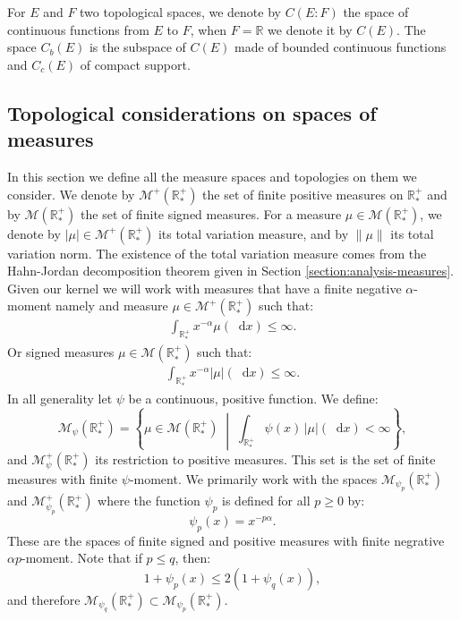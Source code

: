 \documentclass[11pt,a4paper]{article}
\newcommand{\RR}{\mathbb{R}}
\newcommand{\RRP}{\mathbb{R}^+_*}
\newcommand{\MC}{\mathcal{M}}
\newcommand{\dd}{\mathop{}\!\mathrm{d}}
\begin{document}
For $E$ and $F$ two topological spaces, we denote by $C(E:F)$ the space of continuous functions from $E$ to $F$, when $F = \RR$ we denote it by $C(E)$. The space $C_b(E)$ is the subspace of $C(E)$ made of bounded continuous functions and $C_c(E)$ of compact support. 

\subsection{Topological considerations on spaces of measures}

In this section we define all the measure spaces and topologies on them we consider. We denote by $\MC^+(\RRP)$ the set of finite positive measures on $\RRP$ and by $\MC(\RRP)$ the set of finite signed measures. For a measure $\mu \in \MC(\RRP)$, we denote by $|\mu| \in \MC^+(\RRP)$ its total variation measure, and by $\|\mu\|$ its total variation norm. The existence of the total variation measure comes from the Hahn-Jordan decomposition theorem given in Section \ref{section:analysis-measures}. Given our kernel we will work with measures that have a finite negative $\alpha$-moment namely and measure $\mu \in  \MC^+(\RRP)$ such that:
\begin{align*}
    \int_{\RRP} x^{-\alpha} \mu(\dd x) \leq  \infty.
\end{align*}
Or signed measures $\mu \in  \MC(\RRP)$ such that:
\begin{align*}
    \int_{\RRP} x^{-\alpha} |\mu|(\dd x) \leq  \infty.
\end{align*}
In all generality let $\psi$ be a continuous, positive function. We define:
\[
\MC_{\psi}(\RRP) = \left\lbrace \mu \in \MC(\RRP) \;\middle|\; \int_{\RRP} \psi(x)\,|\mu|(\dd x) < \infty \right\rbrace,
\]
and $\MC^+_{\psi}(\RRP)$ its restriction to positive measures. This set is the set of finite measures with finite $\psi$-moment. We primarily work with the spaces $\MC_{\psi_p}(\RRP)$ and $\MC^+_{\psi_p}(\RRP)$ where the function $\psi_p$ is defined for all $p \geq 0$ by:
\[
\psi_p(x) = x^{-p\alpha}.
\]
These are the spaces of finite signed and positive measures with finite negrative $\alpha p$-moment. Note that if $p \leq q$, then:
\[
1 + \psi_p(x) \leq 2(1 + \psi_q(x)),
\]
and therefore $\MC_{\psi_q}(\RRP) \subset \MC_{\psi_p}(\RRP)$. 
\end{document}
